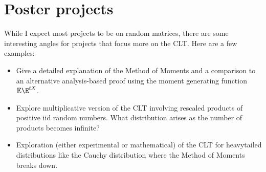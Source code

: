 \section{Poster projects}
While I expect most projects to be on random matrices, there are some interesting angles for projects that focus more on the CLT. Here are a few examples:

\begin{itemize}
\item[1. ] Give a detailed explanation of the Method of Moments and a comparison to an alternative analysis-based proof using the moment generating function $\ensuremath{\bbE}\E^{t X}$.


\item[2. ] Explore multiplicative version of the CLT involving rescaled products of positive iid random numbers. What distribution arises as the number of products becomes infinite?


\item[3. ] Exploration (either experimental or mathematical) of the CLT for heavytailed distributions like the Cauchy distribution where the Method of Moments breaks down.

\end{itemize}

